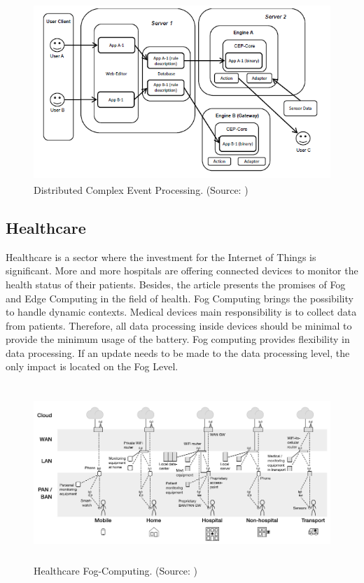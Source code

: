 \documentclass[11pt]{article}
\begin{document}
\begin{figure}[H]
	\includegraphics[width=\textwidth,height=190pt]{assets/Distributed-Complex-Event-Processing.PNG}
	\caption[Distributed Complex Event Processing]{
	Distributed Complex Event Processing. (Source: \cite{Complex-event-processing-for-the-Internet-of-Things})}
\end{figure}

\subsection{Healthcare}

Healthcare is a sector where the investment for the Internet of Things is significant. More and more hospitals are offering connected devices to monitor the health status of their patients. Besides, the article \cite{healthcare-fog-computing} presents the promises of Fog and Edge Computing in the field of health. Fog Computing brings the possibility to handle dynamic contexts. Medical devices main responsibility is to collect data from patients. Therefore, all data processing inside devices should be minimal to provide the minimum usage of the battery. Fog computing provides flexibility in data processing. If an update needs to be made to the data processing level, the only impact is located on the Fog Level.
\newline
\begin{figure}[H]
	\includegraphics[width=\textwidth,height=190pt]{assets/healthcare-fog-computing.PNG}
	\caption[Healthcare Fog-Computing]{
	Healthcare Fog-Computing. (Source: \cite{healthcare-fog-computing})}
	\label{fig:healthcare-fog-computing}
\end{figure}
\end{document}
